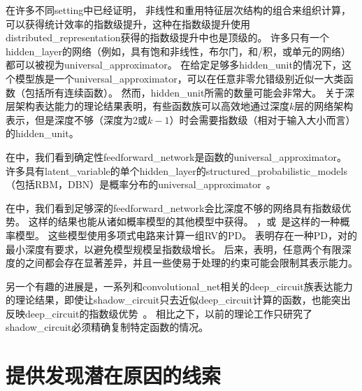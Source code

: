 在许多不同\gls{setting}中已经证明，
非线性和重用特征层次结构的组合来组织计算，可以获得统计效率的指数级提升，这种在指数级提升使用\gls{distributed_representation}获得的指数级提升中也是顶级的。
许多只有一个\gls{hidden_layer}的网络（例如，具有饱和非线性，布尔门，和/积，或单元的网络）都可以被视为\gls{universal_approximator}。
在给定足够多\gls{hidden_unit}的情况下，这个模型族是一个\gls{universal_approximator}，可以在任意非零允错级别近似一大类函数（包括所有连续函数）。
然而，\gls{hidden_unit}所需的数量可能会非常大。
关于深层架构表达能力的理论结果表明，有些函数族可以高效地通过深度$k$层的网络架构表示，但是深度不够（深度为2或$k-1$）时会需要指数级（相对于输入大小而言）的\gls{hidden_unit}。


在中，我们看到确定性\gls{feedforward_network}是函数的\gls{universal_approximator}。
许多具有\gls{latent_variable}的单个\gls{hidden_layer}的\gls{structured_probabilistic_models}（包括\gls{RBM}，\gls{DBN}）是概率分布的\gls{universal_approximator}~\citep{LeRoux-Bengio-2007-TR,Montufar-2011,Montufar-et-al-NIPS2014,Krause-et-al-ICML2013}。

在中，我们看到足够深的\gls{feedforward_network}会比深度不够的网络具有指数级优势。
这样的结果也能从诸如概率模型的其他模型中获得。
，或~\citep{Poon+Domingos-2011}是这样的一种概率模型。
这些模型使用多项式电路来计算一组\gls{RV}的\gls{PD}。
\cite{Delalleau+Bengio-2011-small}表明存在一种\gls{PD}，对的最小深度有要求，以避免模型规模呈指数级增长。
后来，\cite{Martens+Medabalimi-arxiv2014}表明，任意两个有限深度的之间都会存在显著差异，并且一些使易于处理的约束可能会限制其表示能力。

另一个有趣的进展是，一系列和\gls{convolutional_net}相关的\gls{deep_circuit}族表达能力的理论结果，即使让\gls{shadow_circuit}只去近似\gls{deep_circuit}计算的函数，也能突出反映\gls{deep_circuit}的指数级优势~\citep{Cohen-et-al-arXiv2015}。
相比之下，以前的理论工作只研究了\gls{shadow_circuit}必须精确复制特定函数的情况。

\section{提供发现潜在原因的线索}
\label{sec:providing_clues_to_discover_underlying_causes}

